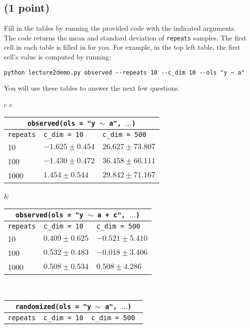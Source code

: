 \documentclass[12pt]{article}
\begin{document}
\subsection{(1 point)}

Fill in the tables by running the provided code with the indicated arguments. The code returns the mean and standard deviation of {\tt repeats} samples. The first cell in each table is filled in for you. For example, in the top left table, the first cell's value is computed by running:
\begin{verbatim}
python lecture2demo.py observed --repeats 10 --c_dim 10 --ols "y ~ a"
\end{verbatim}

You will use these tables to answer the next few questions.

\begin{center}
\begin{tabularx}{\textwidth}{c c}
\centering
{
\centering
\begin{tabularx}{0.45\linewidth}{l l l}
\multicolumn{3}{c}{{\tt \bf observed(ols = "y $\sim$ a", $\ldots$)}} \\
\midrule
{\tt repeats} & {\tt c\_dim = 10} & {\tt c\_dim = 500 }\\
\midrule
10   & $-1.625 \pm 0.454$   & $26.627 \pm 73.807$  \\
100  & $-1.430 \pm 0.472$   & $36.458 \pm 66.111$  \\
1000 & $1.454 \pm 0.544$    & $29.842 \pm 71.167$     \\
\bottomrule
\end{tabularx}
}
& 
{
\centering
\begin{tabularx}{0.45\linewidth}{l l l}
\multicolumn{3}{c}{{\tt \bf observed(ols = "y $\sim$ a + c", $\ldots$)}} \\
\midrule
{\tt repeats} & {\tt c\_dim = 10} & {\tt c\_dim = 500 }\\
\midrule
10   & $0.409 \pm 0.625$  & $-0.521 \pm 5.410$  \\
100  & $0.532 \pm 0.483$  & $-0.018 \pm 3.406$  \\
1000 & $0.508 \pm 0.534$  & $ 0.508 \pm 4.286$  \\
\bottomrule
\end{tabularx}
} \\[2cm]
{
\centering
\begin{tabularx}{0.45\linewidth}{l l l}
\multicolumn{3}{c}{{\tt \bf randomized(ols = "y $\sim$ a", $\ldots$)}} \\
\midrule
{\tt repeats} & {\tt c\_dim = 10} & {\tt c\_dim = 500 }\\

\end{tabularx}}
\end{tabularx}
\end{center}
\end{document}
